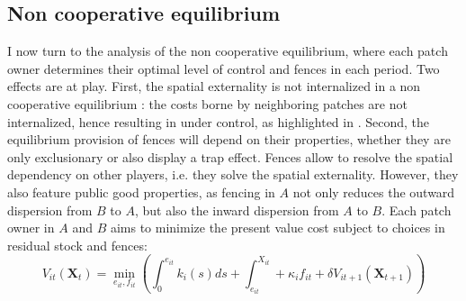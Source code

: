 

\subsection{Non cooperative equilibrium}

I now turn to the analysis of the non cooperative equilibrium, where each patch owner determines their optimal level of control and fences in each period. Two effects are at play. First, the spatial externality is not internalized in a non cooperative equilibrium : the costs borne by neighboring patches are not internalized, hence resulting in under control, as highlighted in \cite{costello_private_2017}. Second, the equilibrium provision of fences will depend on their properties, whether they are only exclusionary or also display a trap effect. Fences allow to resolve the spatial dependency on other players, i.e. they solve the spatial externality. However, they also feature public good properties, as fencing in $A$ not only reduces the outward dispersion from $B$ to $A$, but also the inward dispersion from $A$ to $B$.
Each patch owner in $A$ and $B$ aims to minimize the present value cost subject to choices in residual stock and fences: 
\begin{equation}
V_{it}(\mathbf{X}_t) = \min_{e_{it},f_{it}}\left(\int_{0}^{e_{it}}k_i(s)ds+\int_{e_{it}}^{X_{it}} + \kappa_i f_{it} + \delta V_{it+1}(\mathbf{X}_{t+1}) \right)
\end{equation}

